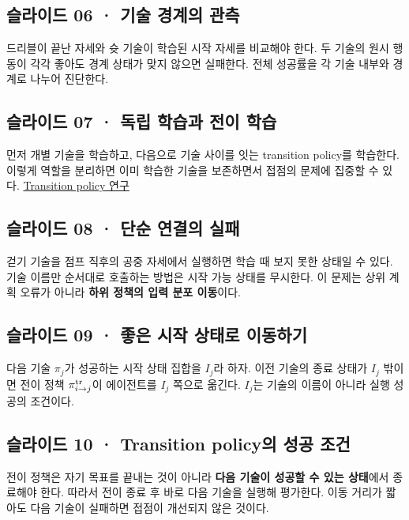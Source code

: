 \documentclass[11pt,a4paper]{article}
\begin{document}
\subsection{슬라이드 06 · 기술 경계의 관측}

드리블이 끝난 자세와 슛 기술이 학습된 시작 자세를 비교해야 한다. 두 기술의 원시 행동이 각각 좋아도 경계 상태가 맞지 않으면 실패한다. 전체 성공률을 각 기술 내부와 경계로 나누어 진단한다.\par

\subsection{슬라이드 07 · 독립 학습과 전이 학습}

먼저 개별 기술을 학습하고, 다음으로 기술 사이를 잇는 transition policy를 학습한다. 이렇게 역할을 분리하면 이미 학습한 기술을 보존하면서 접점의 문제에 집중할 수 있다. \href{https://youngwoon.github.io/transition/}{Transition policy 연구}\par

\subsection{슬라이드 08 · 단순 연결의 실패}

걷기 기술을 점프 직후의 공중 자세에서 실행하면 학습 때 보지 못한 상태일 수 있다. 기술 이름만 순서대로 호출하는 방법은 시작 가능 상태를 무시한다. 이 문제는 상위 계획 오류가 아니라 \textbf{하위 정책의 입력 분포 이동}이다.\par

\subsection{슬라이드 09 · 좋은 시작 상태로 이동하기}

다음 기술 $\pi_j$가 성공하는 시작 상태 집합을 $I_j$라 하자. 이전 기술의 종료 상태가 $I_j$ 밖이면 전이 정책 $\pi_{i\to j}^{\rm tr}$이 에이전트를 $I_j$ 쪽으로 옮긴다. $I_j$는 기술의 이름이 아니라 실행 성공의 조건이다.\par

\subsection{슬라이드 10 · Transition policy의 성공 조건}

전이 정책은 자기 목표를 끝내는 것이 아니라 \textbf{다음 기술이 성공할 수 있는 상태}에서 종료해야 한다. 따라서 전이 종료 후 바로 다음 기술을 실행해 평가한다. 이동 거리가 짧아도 다음 기술이 실패하면 접점이 개선되지 않은 것이다.\par
\end{document}
